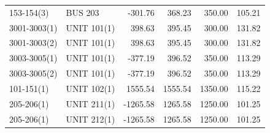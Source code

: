 \documentclass[10pt]{report}
\begin{document}
\begin{table}[H]
{\begin{tabular}{llrrrr}
153-154(3) & BUS 203 & -301.76 & 368.23 & 350.00 & 105.21 \\
3001-3003(1) & UNIT 101(1) & 398.63 & 395.45 & 300.00 & 131.82 \\
3001-3003(2) & UNIT 101(1) & 398.63 & 395.45 & 300.00 & 131.82 \\
3003-3005(1) & UNIT 101(1) & -377.19 & 396.52 & 350.00 & 113.29 \\
3003-3005(2) & UNIT 101(1) & -377.19 & 396.52 & 350.00 & 113.29 \\
101-151(1) & UNIT 102(1) & 1555.54 & 1555.54 & 1350.00 & 115.22 \\
205-206(1) & UNIT 211(1) & -1265.58 & 1265.58 & 1250.00 & 101.25 \\
205-206(1) & UNIT 212(1) & -1265.58 & 1265.58 & 1250.00 & 101.25 \\
\bottomrule
\end{tabular}}
\end{table}
\end{document}
